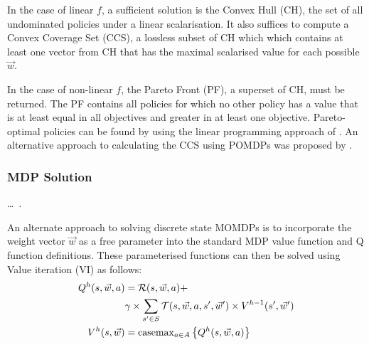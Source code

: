 In the case of linear {\footnotesize $ f $}, a sufficient solution is the Convex Hull (CH), the set of all undominated policies under a linear scalarisation. It also suffices to compute a Convex Coverage Set (CCS), a lossless subset of CH which which contains at least one vector from CH that has the maximal scalarised value for each possible {\footnotesize $ \vec{w} $}. 

In the case of non-linear {\footnotesize $ f $}, the Pareto Front (PF), a superset of CH, must be returned. The PF contains all policies for which no other policy has a value that is at least equal in all objectives and greater in at least one objective. Pareto-optimal policies can be found by using the linear programming approach of \parencite{Viswanathan_TIMS_1977}. An alternative approach to calculating the CCS using POMDPs was proposed by \parencite{White_LSS_1980}.

\subsubsection{MDP Solution}


\ldots~\parencite{Barrett_ICML_2008}.

An alternate approach to solving discrete state MOMDPs is to incorporate the weight vector {\footnotesize $ \vec{w} $} as a free parameter into the standard MDP value function and Q function definitions. These parameterised functions can then be solved using Value iteration (VI) \parencite{Howard_MIT_1960} as follows:
{\footnotesize 
    \abovedisplayskip=0pt
    \belowdisplayskip=0pt
    \begin{align}
        Q^{h}(s, \vec{w}, a) &= \mathcal{R}(s, \vec{w}, a) + \nonumber \\
        & \gamma \times \sum_{s' \in S} \mathcal{T}(s, \vec{w}, a, s', \vec{w}') \times V^{h-1}(s', \vec{w}') \label{eq:qfunc}\\
        V^{h}(s, \vec{w}) &= \mathrm{casemax}_{a \in A} \left\{ Q^{h}(s, \vec{w}, a) \right\} \label{eq:vfunc}
    \end{align}
}%

